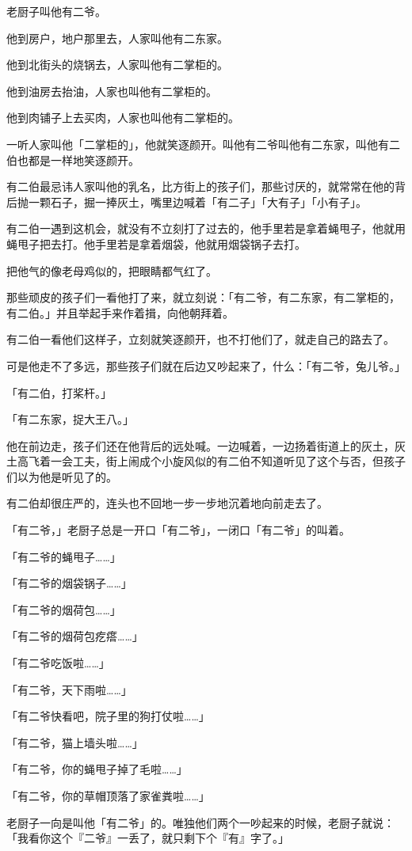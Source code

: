 \documentclass[UTF8]{ctexart}
\begin{document}
老厨子叫他有二爷。

他到房户，地户那里去，人家叫他有二东家。

他到北街头的烧锅去，人家叫他有二掌柜的。

他到油房去抬油，人家也叫他有二掌柜的。

他到肉铺子上去买肉，人家也叫他有二掌柜的。

一听人家叫他「二掌柜的」，他就笑逐颜开。叫他有二爷叫他有二东家，叫他有二伯也都是一样地笑逐颜开。

有二伯最忌讳人家叫他的乳名，比方街上的孩子们，那些讨厌的，就常常在他的背后抛一颗石子，掘一捧灰土，嘴里边喊着「有二子」「大有子」「小有子」。

有二伯一遇到这机会，就没有不立刻打了过去的，他手里若是拿着蝇甩子，他就用蝇甩子把去打。他手里若是拿着烟袋，他就用烟袋锅子去打。

把他气的像老母鸡似的，把眼睛都气红了。

那些顽皮的孩子们一看他打了来，就立刻说：「有二爷，有二东家，有二掌柜的，有二伯。」并且举起手来作着揖，向他朝拜着。

有二伯一看他们这样子，立刻就笑逐颜开，也不打他们了，就走自己的路去了。

可是他走不了多远，那些孩子们就在后边又吵起来了，什么：「有二爷，兔儿爷。」

「有二伯，打桨杆。」

「有二东家，捉大王八。」

他在前边走，孩子们还在他背后的远处喊。一边喊着，一边扬着街道上的灰土，灰土高飞着一会工夫，街上闹成个小旋风似的有二伯不知道听见了这个与否，但孩子们以为他是听见了的。

有二伯却很庄严的，连头也不回地一步一步地沉着地向前走去了。

「有二爷，」老厨子总是一开口「有二爷」，一闭口「有二爷」的叫着。

「有二爷的蝇甩子……」

「有二爷的烟袋锅子……」

「有二爷的烟荷包……」

「有二爷的烟荷包疙瘩……」

「有二爷吃饭啦……」

「有二爷，天下雨啦……」

「有二爷快看吧，院子里的狗打仗啦……」

「有二爷，猫上墙头啦……」

「有二爷，你的蝇甩子掉了毛啦……」

「有二爷，你的草帽顶落了家雀粪啦……」

老厨子一向是叫他「有二爷」的。唯独他们两个一吵起来的时候，老厨子就说：「我看你这个『二爷』一丢了，就只剩下个『有』字了。」
\end{document}
